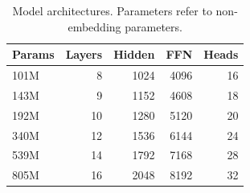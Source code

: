 \begin{table}[t]
\centering
\caption{Model architectures. Parameters refer to non-embedding parameters. 
}
\label{tab:model_sizes}
\begin{tabular}{lrrrr}
\toprule
Params & Layers & Hidden & FFN & Heads \\
\midrule
101M & 8  & 1024 & 4096 & 16 \\
143M & 9  & 1152 & 4608 & 18 \\
192M & 10 & 1280 & 5120 & 20 \\
340M & 12 & 1536 & 6144 & 24 \\
539M & 14 & 1792 & 7168 & 28 \\
805M & 16 & 2048 & 8192 & 32 \\
\bottomrule
\end{tabular}
\label{tab:model_arch}
\end{table}

